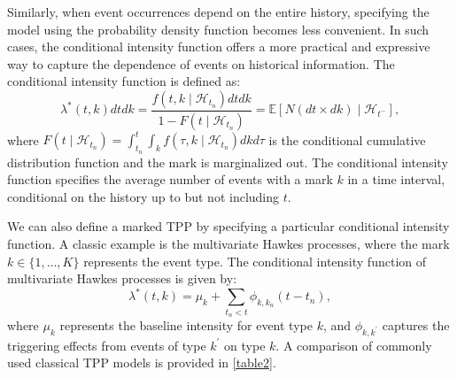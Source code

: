 \documentclass[10pt]{article} %
\begin{document}
Similarly, when event occurrences depend on the entire history, specifying the model using the probability density function becomes less convenient. In such cases, the conditional intensity function offers a more practical and expressive way to capture the dependence of events on historical information. The conditional intensity function is defined as: 
\begin{equation*}
    \lambda^*(t, k) dtdk = \frac{f(t, k \mid \mathcal{H}_{t_n}) dtdk}{1 - F(t \mid \mathcal{H}_{t_n})}=\mathbb{E}[N(dt\times dk)\mid \mathcal{H}_{t^-}], 
\end{equation*}
where \(F(t\mid\mathcal{H}_{t_n}) = \int_{t_n}^t \int_k f(\tau,k\mid\mathcal{H}_{t_n}) dk d\tau\) is the conditional cumulative distribution function and the mark is marginalized out. 
The conditional intensity function specifies the average number of events with a mark \(k\) in a time interval, conditional on the history up to but not including \(t\). 

We can also define a marked TPP by specifying a particular conditional intensity function. 
A classic example is the multivariate Hawkes processes, where the mark \(k \in \{1, \ldots, K\}\) represents the event type. 
The conditional intensity function of multivariate Hawkes processes is given by: 
\begin{equation}
    \lambda^*(t, k) = \mu_k + \sum_{t_n < t} \phi_{k, k_n}(t - t_n), 
    \label{mhp}
\end{equation}
where \(\mu_k\) represents the baseline intensity for event type \(k\), and \(\phi_{k, k^\prime}\) captures the triggering effects from events of type \(k^\prime\) on type \(k\). 
A comparison of commonly used classical TPP models is provided in \cref{table2}.

\begin{table}[!htbp]
    \caption{Comparison of classic TPP models.}
    \label{table2}
    \centering
\end{table}
\end{document}
